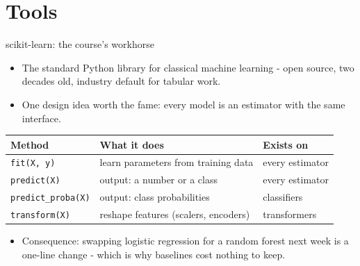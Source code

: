 \documentclass[10pt,aspectratio=169]{beamer}
\begin{document}
\section{Tools}

\begin{frame}{scikit-learn: the course's workhorse}
  \begin{itemize}
    \item The standard Python library for classical machine learning -
          open source, two decades old, industry default for tabular work.
    \item One design idea worth the fame: \alert{every model is an
          estimator with the same interface}.
  \end{itemize}
  \vspace{0.4em}
  \small
  \begin{center}
  \begin{tabular}{@{}lll@{}}
    \toprule
    Method & What it does & Exists on \\
    \midrule
    \texttt{fit(X, y)} & learn parameters from training data & every estimator \\
    \texttt{predict(X)} & output: a number or a class & every estimator \\
    \texttt{predict\_proba(X)} & output: class \alert{probabilities} & classifiers \\
    \texttt{transform(X)} & reshape features (scalers, encoders) & transformers \\
    \bottomrule
  \end{tabular}
  \end{center}
  \vspace{0.4em}
  \begin{itemize}\small
    \item Consequence: swapping logistic regression for a random forest next
          week is a \alert{one-line change} - which is why baselines cost
          nothing to keep.
  \end{itemize}
\end{frame}
\end{document}
